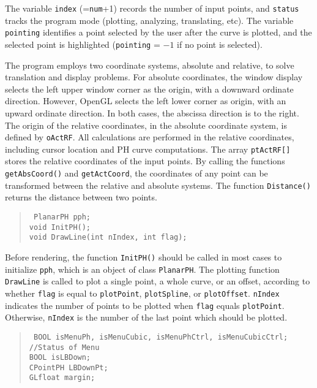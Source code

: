 \documentclass[12pt]{article}
\begin{document}
\noindent
The variable {\tt index} (={\tt num}+1) records the number of input points, 
and {\tt status} tracks the program mode (plotting, analyzing, translating, 
etc). The variable {\tt pointing} identifies a point selected by the user 
after the curve is plotted, and the selected point is highlighted 
({\tt pointing} = $-1$ if no point is selected).

The program employs two coordinate systems, absolute and relative, to 
solve translation and display problems. For absolute coordinates, the window 
display selects the left upper window corner as the origin, with a downward 
ordinate direction. However, OpenGL selects the left lower corner as origin, 
with an upward ordinate direction. In both cases, the abscissa direction 
is to the right. The origin of the relative coordinates, in the absolute 
coordinate system, is defined by {\tt o\underline{\hphantom{x}}ActRF}. All 
calculations are performed in the relative coordinates, including cursor 
location and PH curve computations. The array {\tt ptActRF[]} stores the 
relative coordinates of the input points. By calling the functions 
{\tt getAbsCoord()} and {\tt getActCoord}, the coordinates of any point 
can be transformed between the relative and absolute systems. The function 
{\tt Distance()} returns the distance between two points.

\begin{quote}
{\tt
PlanarPH pph; \\
void InitPH(); \\
void DrawLine(int nIndex, int flag);
}
\end{quote}

Before rendering, the function {\tt InitPH()} should be called in most 
cases to initialize {\tt pph}, which is an object of class {\tt PlanarPH}. 
The plotting function {\tt DrawLine} is called to plot a single point, a
whole curve, or an offset, according to whether {\tt flag} is equal to 
{\tt plotPoint}, {\tt plotSpline}, or {\tt plotOffset}. {\tt nIndex} 
indicates the number of points to be plotted when {\tt flag} equals 
{\tt plotPoint}. Otherwise, {\tt nIndex} is the number of the last 
point which should be plotted.

\begin{quote}
{\tt
BOOL isMenuPh, isMenuCubic, isMenuPhCtrl, isMenuCubicCtrl; \\
//Status of Menu \\
BOOL isLBDown; \\
CPointPH LBDownPt; \\
GLfloat margin;
}
\end{quote}
\end{document}
